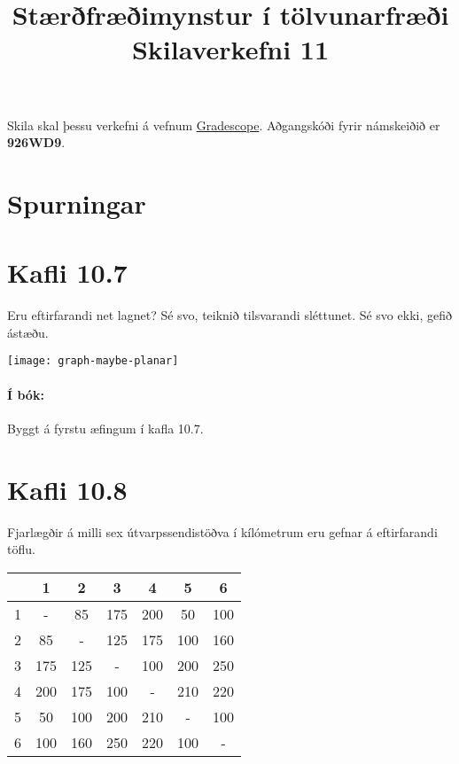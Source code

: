 \documentclass{exam}
\title{Stærðfræðimynstur í tölvunarfræði \\ Skilaverkefni 11}
\author{}
\begin{document}
\maketitle
\thispagestyle{empty} 

Skila skal þessu verkefni á vefnum \href{https://gradescope.com/}{Gradescope}. Aðgangskóði fyrir námskeiðið er \textbf{926WD9}.


\section{Spurningar}

\begin{questions}

\section{Kafli 10.7}

\question Eru eftirfarandi net lagnet? Sé svo, teiknið tilsvarandi sléttunet. Sé svo ekki, gefið ástæðu.

\begin{center}
\texttt{[image: graph-maybe-planar]}
\end{center}

\paragraph{Í bók:} Byggt á fyrstu æfingum í kafla 10.7.

\section{Kafli 10.8}

\question Fjarlægðir á milli sex útvarpssendistöðva í kílómetrum eru gefnar á eftirfarandi töflu.

\begin{center}

\begin{tabular}{ccccccc}
\toprule
&1&2&3&4&5&6\\
\midrule
1&-&85&175&200&50&100\\
2&85&-&125&175&100&160\\
3&175&125&-&100&200&250\\
4&200&175&100&-&210&220\\
5&50&100&200&210&-&100\\
6&100&160&250&220&100&-\\
\bottomrule
\end{tabular}


\end{center}
\end{questions}
\end{document}
